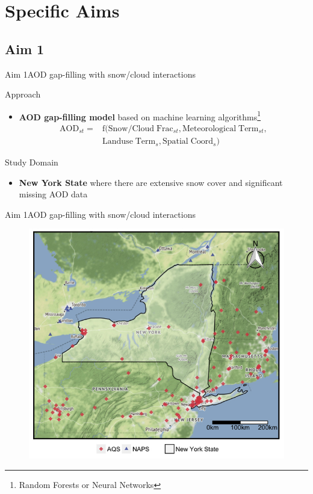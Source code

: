 \documentclass{beamer}
\begin{document}
\section{Specific Aims}
\subsection{Aim 1}
\begin{frame}{Aim 1}{AOD gap-filling with snow/cloud interactions}
    \begin{block}{Approach}
        \begin{itemize}
            \item \textbf{AOD gap-filling model} based on machine learning algorithms\footnote{Random Forests or Neural Networks}
                \begin{align*}
                    \mathrm{AOD_{\mathit{st}}} = & \mathrm{f(Snow/Cloud\;Frac_{\mathit{st}}, Meteorological\;Term_{\mathit{st}},}\\
                    &\mathrm{Landuse\;Term_\mathit{s}, Spatial\;Coord_\mathit{s})}
                \end{align*}
        \end{itemize}
    \end{block}
    \vspace{-15pt}
    \pause
    \begin{block}{Study Domain}
        \begin{itemize}
            \item \textbf{New York State} where there are extensive snow cover and significant missing AOD data
        \end{itemize}
    \end{block}
\end{frame}

\begin{frame}{Aim 1}{AOD gap-filling with snow/cloud interactions}
    \begin{figure}
        \centering
        \includegraphics[height=0.6\textwidth]{img/ny.jpg}
        \label{fig:aim1}
    \end{figure}
\end{frame}
\end{document}
